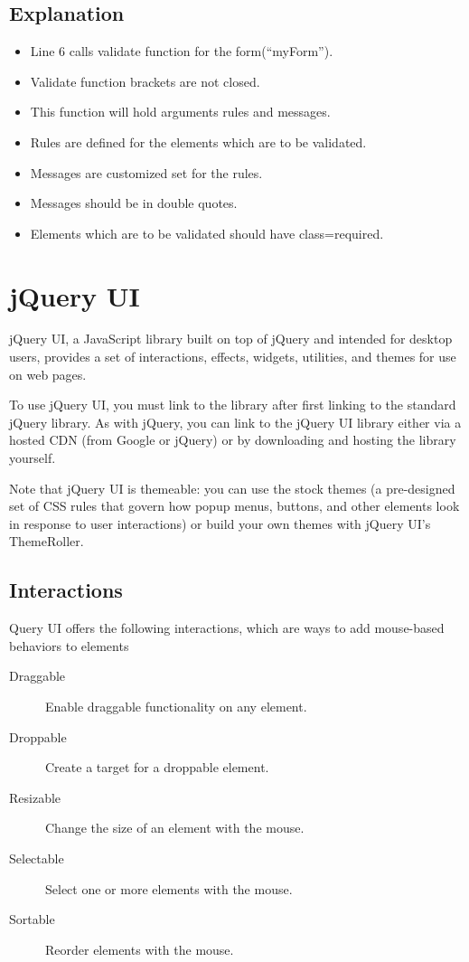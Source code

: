 \documentclass[11pt,a4paper]{article}
\begin{document}
\subsection*{Explanation}
\begin{itemize}
 \item Line 6 calls validate function for the form(``myForm'').
 \item Validate function brackets are not closed.
 \item This function will hold arguments rules and messages.
 \item Rules are defined for the elements which are to be validated.
 \item Messages are customized set for the rules.
 \item Messages should be in double quotes.
 \item Elements which are to be validated should have class=required.
\end{itemize}


\section*{jQuery UI}
jQuery UI, a JavaScript library built on top of jQuery and intended for desktop users, provides a set of interactions, effects, widgets, utilities, and themes for use on web pages.

To use jQuery UI, you must link to the library after first linking to the standard jQuery library. As with jQuery, you can link to the jQuery UI library either via a hosted CDN (from Google or jQuery) or by downloading and hosting the library yourself.

Note that jQuery UI is themeable: you can use the stock themes (a pre-designed set of CSS rules that govern how popup menus, buttons, and other elements look in response to user interactions) or build your own themes with jQuery UI’s ThemeRoller.


\subsection*{Interactions}
 
Query UI offers the following interactions, which are ways to add mouse-based behaviors to elements
\begin{description}
 \item [Draggable] Enable draggable functionality on any element.
 \item [Droppable] Create a target for a droppable element.
 \item [Resizable] Change the size of an element with the mouse.
 \item [Selectable] Select one or more elements with the mouse.
 \item [Sortable] Reorder elements with the mouse.

\end{description}
\pagebreak
\end{document}

